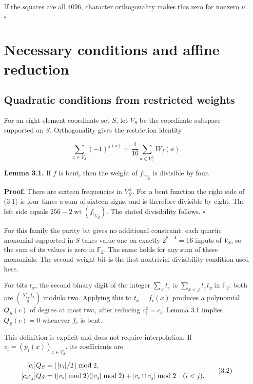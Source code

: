 \documentclass[pdflatex,sn-mathphys-num]{sn-jnl}
\begin{document}
If the squares are all $4096$, character orthogonality makes this zero for nonzero $u$. \hfill$\square$

\section{Necessary conditions and affine reduction}\label{sec:3}

\subsection{Quadratic conditions from restricted weights}\label{subsec:3:1}

For an eight-element coordinate set $S$, let $V_S$ be the coordinate subspace supported on $S$. Orthogonality gives the restriction identity

\[
\sum_{x\in V_S}(-1)^{f(x)}=\frac1{16}\sum_{a\in V_S^\perp}W_f(a). \tag{3.1}
\]

\textbf{Lemma 3.1.} If $f$ is bent, then the weight of $f|_{V_S}$ is divisible by four.

\textbf{Proof.} There are sixteen frequencies in $V_S^\perp$. For a bent function the right side of (3.1) is four times a sum of sixteen signs, and is therefore divisible by eight. The left side equals $256-2\operatorname{wt}(f|_{V_S})$. The stated divisibility follows. \hfill$\square$

For this family the parity bit gives no additional constraint: each quartic monomial supported in $S$ takes value one on exactly $2^{8-4}=16$ inputs of $V_S$, so the sum of its values is zero in $\mathbb F_2$. The same holds for any sum of these monomials. The second weight bit is the first nontrivial divisibility condition used here.

For bits $t_x$, the second binary digit of the integer $\sum_x t_x$ is
$\sum_{x<y}t_xt_y$ in $\mathbb F_2$: both are $\binom{\sum_x t_x}{2}$ modulo two. Applying this to $t_x=f_c(x)$ produces a polynomial $Q_S(c)$ of degree at most two, after reducing $c_i^2=c_i$. Lemma 3.1 implies $Q_S(c)=0$ whenever $f_c$ is bent.

This definition is explicit and does not require interpolation. If $v_i=(p_i(x))_{x\in V_S}$, its coefficients are

\[
\begin{aligned}\relax[c_i]Q_S&=\left\lfloor |v_i|/2\right\rfloor\bmod2,\\\relax[c_ic_j]Q_S&=(|v_i|\bmod2)(|v_j|\bmod2)+|v_i\cap v_j|\bmod2\quad(i<j).\end{aligned} \tag{3.2}
\]
\end{document}
